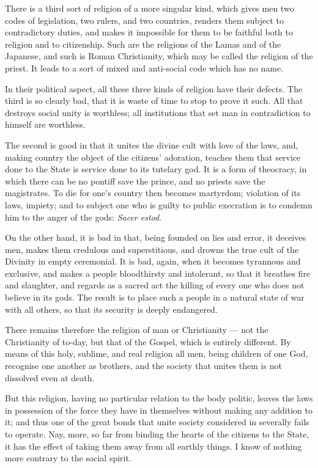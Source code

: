 \documentclass[12pt]{book}
\begin{document}
There is a third sort of religion of a more singular kind, which gives men two codes of legislation, two rulers, and two countries, renders them subject to contradictory duties, and makes it impossible for them to be faithful both to religion and to citizenship. Such are the religions of the Lamas and of the Japanese, and such is Roman Christianity, which may be called the religion of the priest. It leads to a sort of mixed and anti-social code which has no name.

In their political aspect, all these three kinds of religion have their defects. The third is so clearly bad, that it is waste of time to stop to prove it such. All that destroys social unity is worthless; all institutions that set man in contradiction to himself are worthless.

The second is good in that it unites the divine cult with love of the laws, and, making country the object of the citizens' adoration, teaches them that service done to the State is service done to its tutelary god. It is a form of theocracy, in which there can be no pontiff save the prince, and no priests save the magistrates. To die for one's country then becomes martyrdom; violation of its laws, impiety; and to subject one who is guilty to public execration is to condemn him to the anger of the gods: \textit{Sacer estod}.

On the other hand, it is bad in that, being founded on lies and error, it deceives men, makes them credulous and superstitious, and drowns the true cult of the Divinity in empty ceremonial. It is bad, again, when it becomes tyrannous and exclusive, and makes a people bloodthirsty and intolerant, so that it breathes fire and slaughter, and regards as a sacred act the killing of every one who does not believe in its gods. The result is to place such a people in a natural state of war with all others, so that its security is deeply endangered.

There remains therefore the religion of man or Christianity — not the Christianity of to-day, but that of the Gospel, which is entirely different. By means of this holy, sublime, and real religion all men, being children of one God, recognise one another as brothers, and the society that unites them is not dissolved even at death.

But this religion, having no particular relation to the body politic, leaves the laws in possession of the force they have in themselves without making any addition to it; and thus one of the great bonds that unite society considered in severally fails to operate. Nay, more, so far from binding the hearts of the citizens to the State, it has the effect of taking them away from all earthly things. I know of nothing more contrary to the social spirit.
\end{document}
